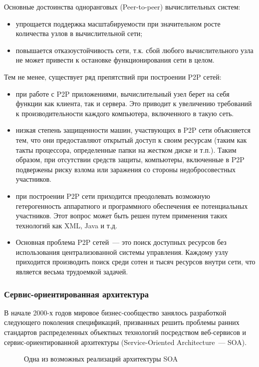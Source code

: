 Основные достоинства одноранговых (Peer-to-peer) вычислительных систем:
\begin{itemize}
\item упрощается поддержка масштабируемости при значительном росте количества узлов в вычислительной сети; 
\item повышается отказоустойчивость сети, т.к. сбой любого вычислительного узла не может привести к остановке функционирования сети в целом.
\end{itemize}

Тем не менее, существует ряд препятствий при построении P2P сетей:
\begin{itemize}
\item при работе с P2P приложениями, вычислительный узел берет на себя функции как клиента, так и сервера. Это приводит к увеличению требований к производительности каждого компьютера, включенного в такую сеть.
\item низкая степень защищенности машин, участвующих в P2P сети объясняется тем, что они предоставляют открытый доступ к своим ресурсам (таким как такты процессора, определенные папки на жестком диске и т.п.). Таким образом, при отсутствии средств защиты, компьютеры, включенные в P2P подвержены риску взлома или заражения со стороны недобросовестных участников. 
\item при построении P2P сети приходится преодолевать возможную гетерогенность аппаратного и программного обеспечения ее потенциальных участников. Этот вопрос может быть решен путем применения таких технологий как XML, Java и т.д.
\item Основная проблема P2P сетей~--- это поиск доступных ресурсов без использования централизованной системы управления. Каждому узлу приходится производить поиск среди сотен и тысяч ресурсов внутри сети, что является весьма трудоемкой задачей.
\end{itemize}

\subsubsection{Сервис-ориентированная архитектура}
В начале 2000-х годов мировое бизнес-сообщество занялось разработкой следующего поколения спецификаций, призванных решить проблемы ранних стандартов распределенных объектных технологий посредством веб-сервисов и сервис-ориентированной архитектуры (Service-Oriented Architecture~--- SOA).

\begin{figure}[h]
\caption{Одна из возможных реализаций архитектуры SOA}
\label{0:soa}
\end{figure}

